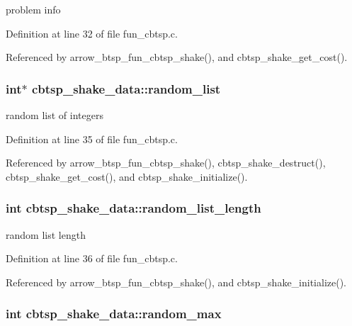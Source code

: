 problem info 

Definition at line 32 of file fun\_\-cbtsp.c.

Referenced by arrow\_\-btsp\_\-fun\_\-cbtsp\_\-shake(), and cbtsp\_\-shake\_\-get\_\-cost().\hypertarget{structcbtsp__shake__data_325d0115e7fe18f7fede7e164e6f6d8f}{
\subsubsection[{random\_\-list}]{\setlength{\rightskip}{0pt plus 5cm}int$\ast$ {\bf cbtsp\_\-shake\_\-data::random\_\-list}}}
\label{structcbtsp__shake__data_325d0115e7fe18f7fede7e164e6f6d8f}


random list of integers 

Definition at line 35 of file fun\_\-cbtsp.c.

Referenced by arrow\_\-btsp\_\-fun\_\-cbtsp\_\-shake(), cbtsp\_\-shake\_\-destruct(), cbtsp\_\-shake\_\-get\_\-cost(), and cbtsp\_\-shake\_\-initialize().\hypertarget{structcbtsp__shake__data_20b4fd190a23a1a0cb3e869716d2af3f}{
\subsubsection[{random\_\-list\_\-length}]{\setlength{\rightskip}{0pt plus 5cm}int {\bf cbtsp\_\-shake\_\-data::random\_\-list\_\-length}}}
\label{structcbtsp__shake__data_20b4fd190a23a1a0cb3e869716d2af3f}


random list length 

Definition at line 36 of file fun\_\-cbtsp.c.

Referenced by arrow\_\-btsp\_\-fun\_\-cbtsp\_\-shake(), and cbtsp\_\-shake\_\-initialize().\hypertarget{structcbtsp__shake__data_c60975938eff642adfafd228b666d536}{
\subsubsection[{random\_\-max}]{\setlength{\rightskip}{0pt plus 5cm}int {\bf cbtsp\_\-shake\_\-data::random\_\-max}}}
\label{structcbtsp__shake__data_c60975938eff642adfafd228b666d536}


